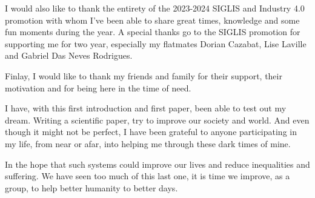 \documentclass[conference]{IEEEtran}
\begin{document}
I would also like to thank the entirety of the 2023-2024 SIGLIS and Industry 4.0 promotion with whom I've been able to share great times, knowledge and some fun moments during the year. A special thanks go to the SIGLIS promotion for supporting me for two year, especially my flatmates Dorian Cazabat, Lise Laville and Gabriel Das Neves Rodrigues. 

Finlay, I would like to thank my friends and family for their support, their motivation and for being here in the time of need.

\vspace{12pt}
I have, with this first introduction and first paper, been able to test out my dream. Writing a scientific paper, try to improve our society and world. And even though it might not be perfect, I have been grateful to anyone participating in my life, from near or afar, into helping me through these dark times of mine.

In the hope that such systems could improve our lives and reduce inequalities and suffering. We have seen too much of this last one, it is time we improve, as a group, to help better humanity to better days.
\vspace{12pt}



\printglossary
\end{document}
